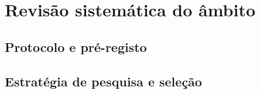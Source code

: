
\chapter{Revisão sistemática do âmbito}
\label{cha:revisao}

\section{Protocolo e pré-registo}
\label{sec:protocolo-sr}



\section{Estratégia de pesquisa e seleção}
\label{sec:pesquisa}



